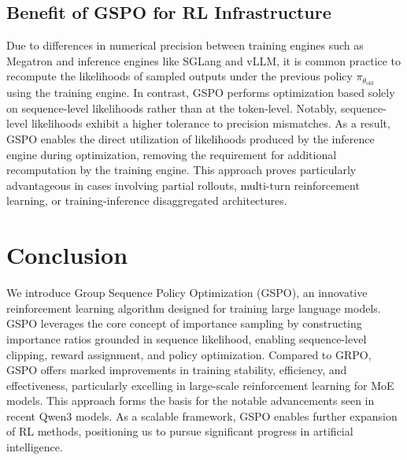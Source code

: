 \subsection{Benefit of GSPO for RL Infrastructure}

Due to differences in numerical precision between training engines such as Megatron and inference engines like SGLang and vLLM, it is common practice to recompute the likelihoods of sampled outputs under the previous policy $\pi_{\theta_\text{old}}$ using the training engine. In contrast, GSPO performs optimization based solely on sequence-level likelihoods rather than at the token-level. Notably, sequence-level likelihoods exhibit a higher tolerance to precision mismatches. As a result, GSPO enables the direct utilization of likelihoods produced by the inference engine during optimization, removing the requirement for additional recomputation by the training engine. This approach proves particularly advantageous in cases involving partial rollouts, multi-turn reinforcement learning, or training-inference disaggregated architectures.

\section{Conclusion}

We introduce Group Sequence Policy Optimization (GSPO), an innovative reinforcement learning algorithm designed for training large language models. GSPO leverages the core concept of importance sampling by constructing importance ratios grounded in sequence likelihood, enabling sequence-level clipping, reward assignment, and policy optimization. Compared to GRPO, GSPO offers marked improvements in training stability, efficiency, and effectiveness, particularly excelling in large-scale reinforcement learning for MoE models. This approach forms the basis for the notable advancements seen in recent Qwen3 models. As a scalable framework, GSPO enables further expansion of RL methods, positioning us to pursue significant progress in artificial intelligence.

